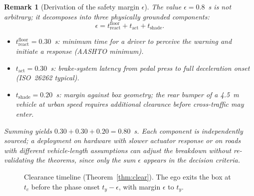 \documentclass[conference, a4paper]{IEEEtran}
\theoremstyle{plain}
\newtheorem{remark}[theorem]{Remark}
\begin{document}
\begin{remark}[Derivation of the safety margin $\epsilon$]
\label{rem:epsilon_derivation}
The value $\epsilon = 0.8$~s is not arbitrary; it decomposes into three
physically grounded components:
\[
\epsilon = t_{\mathrm{react}}^{\mathrm{floor}} + t_{\mathrm{act}} + t_{\mathrm{shade}}.
\]
\begin{itemize}
  \item $t_{\mathrm{react}}^{\mathrm{floor}} = 0.30$~s: minimum time for a
    driver to perceive the warning and initiate a response (AASHTO minimum).
  \item $t_{\mathrm{act}} = 0.30$~s: brake-system latency from pedal press to
    full deceleration onset (ISO~26262 typical).
  \item $t_{\mathrm{shade}} = 0.20$~s: margin against box geometry; the rear
    bumper of a 4.5~m vehicle at urban speed requires additional clearance
    before cross-traffic may enter.
\end{itemize}
Summing yields $0.30 + 0.30 + 0.20 = 0.80$~s. Each component is independently
sourced; a deployment on hardware with slower actuator response or on roads
with different vehicle-length assumptions can adjust the breakdown without
re-validating the theorems, since only the sum $\epsilon$ appears in the
decision criteria.
\end{remark}

\begin{figure}[t]
\centering
{}
\caption{Clearance timeline (Theorem~\ref{thm:clear}). The ego exits
the box at $t_c$ before the phase onset $t_y - \epsilon$, with margin
$\epsilon$ to $t_y$.}
\label{fig:timeline}
\end{figure}
\end{document}
